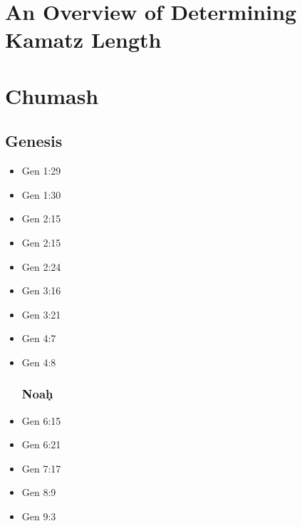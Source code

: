 \documentclass[14pt]{book}
\begin{document}
\chapter{An Overview of Determining Kamatz Length}


\chapter{Chumash}

\section{Genesis}

\begin{multicols}{2}
\begin{itemize} \item Gen 1:29

\item Gen 1:30

\item Gen 2:15

\item Gen 2:15

\item Gen 2:24

\item Gen 3:16

\item Gen 3:21

\item Gen 4:7

\item Gen 4:8

\subsection{Noa\d{h}}

\item Gen 6:15

\item Gen 6:21

\item Gen 7:17

\item Gen 8:9

\item Gen 9:3


\end{itemize}
\end{multicols}
\end{document}
